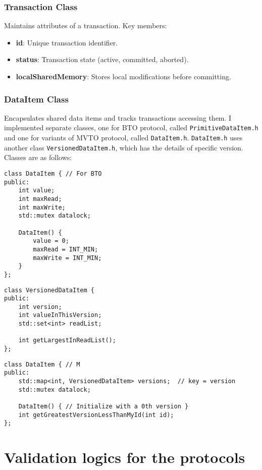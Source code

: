 \documentclass[10pt]{article}
\begin{document}
\subsubsection{Transaction Class}
Maintains attributes of a transaction. Key members:
\begin{itemize}
    \item \textbf{id}: Unique transaction identifier.
    \item \textbf{status}: Transaction state (active, committed, aborted).
    \item \textbf{localSharedMemory}: Stores local modifications before committing.
\end{itemize}

\subsubsection{DataItem Class}
Encapsulates shared data items and tracks transactions accessing them. I implemented separate classes, one for BTO protocol, called \texttt{PrimitiveDataItem.h} and one for variants of MVTO protocol, called \texttt{DataItem.h}. \texttt{DataItem.h} uses another class \texttt{VersionedDataItem.h}, which has the details of specific version.
Classes are as follows:
\begin{lstlisting}
class DataItem { // For BTO
public:
    int value;
    int maxRead;
    int maxWrite;
    std::mutex datalock;

    DataItem() {
        value = 0;
        maxRead = INT_MIN;
        maxWrite = INT_MIN;
    }
};
\end{lstlisting}

\begin{lstlisting}
class VersionedDataItem {
public:
    int version;
    int valueInThisVersion;
    std::set<int> readList;

    int getLargestInReadList();
};
\end{lstlisting}

\begin{lstlisting}
class DataItem { // M
public:
    std::map<int, VersionedDataItem> versions;  // key = version
    std::mutex datalock;

    DataItem() { // Initialize with a 0th version }
    int getGreatestVersionLessThanMyId(int id);
};
\end{lstlisting}

\section{Validation logics for the protocols}
\end{document}
